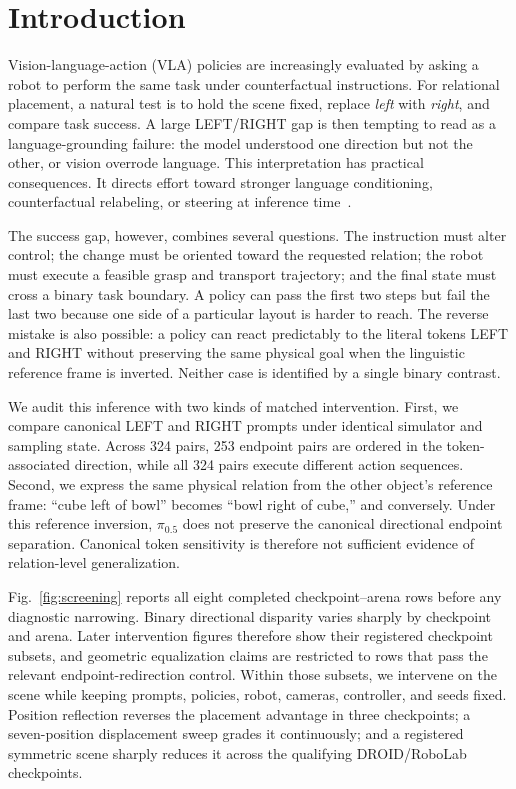 \section{Introduction}
\label{sec:introduction}

Vision-language-action (VLA) policies are increasingly evaluated by asking a robot to perform the same task under counterfactual instructions. For relational placement, a natural test is to hold the scene fixed, replace \emph{left} with \emph{right}, and compare task success. A large LEFT/RIGHT gap is then tempting to read as a language-grounding failure: the model understood one direction but not the other, or vision overrode language. This interpretation has practical consequences. It directs effort toward stronger language conditioning, counterfactual relabeling, or steering at inference time~\cite{fang2026cag,glossop2025cast,chen2026steerable}.

The success gap, however, combines several questions. The instruction must alter control; the change must be oriented toward the requested relation; the robot must execute a feasible grasp and transport trajectory; and the final state must cross a binary task boundary. A policy can pass the first two steps but fail the last two because one side of a particular layout is harder to reach. The reverse mistake is also possible: a policy can react predictably to the literal tokens LEFT and RIGHT without preserving the same physical goal when the linguistic reference frame is inverted. Neither case is identified by a single binary contrast.

We audit this inference with two kinds of matched intervention. First, we compare canonical LEFT and RIGHT prompts under identical simulator and sampling state. Across 324 pairs, 253 endpoint pairs are ordered in the token-associated direction, while all 324 pairs execute different action sequences. Second, we express the same physical relation from the other object's reference frame: ``cube left of bowl'' becomes ``bowl right of cube,'' and conversely. Under this reference inversion, $\pi_{0.5}$ does not preserve the canonical directional endpoint separation. Canonical token sensitivity is therefore not sufficient evidence of relation-level generalization.

Fig.~\ref{fig:screening} reports all eight completed checkpoint--arena rows before any diagnostic narrowing. Binary directional disparity varies sharply by checkpoint and arena. Later intervention figures therefore show their registered checkpoint subsets, and geometric equalization claims are restricted to rows that pass the relevant endpoint-redirection control. Within those subsets, we intervene on the scene while keeping prompts, policies, robot, cameras, controller, and seeds fixed. Position reflection reverses the placement advantage in three checkpoints; a seven-position displacement sweep grades it continuously; and a registered symmetric scene sharply reduces it across the qualifying DROID/RoboLab checkpoints.

